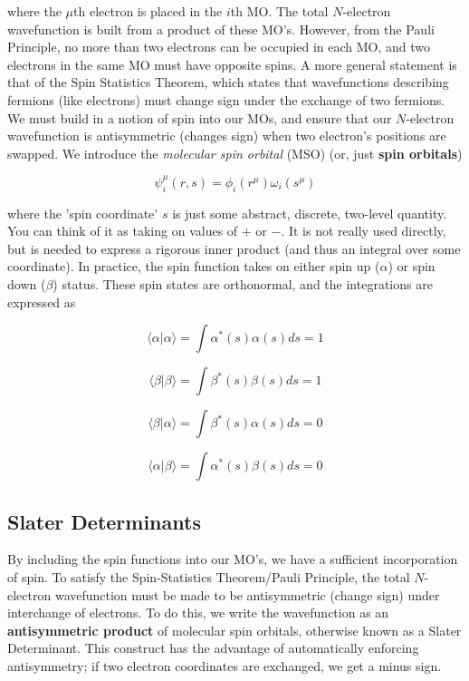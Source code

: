 \documentclass[11pt]{article}
\begin{document}
where the \(\mu\)th electron is placed in the \(i\)th MO. The total
\(N\)-electron wavefunction is built from a product of these MO's.
However, from the Pauli Principle, no more than two electrons can be
occupied in each MO, and two electrons in the same MO must have opposite
spins. A more general statement is that of the Spin Statistics Theorem,
which states that wavefunctions describing fermions (like electrons)
must change sign under the exchange of two fermions. We must build in a
notion of spin into our MOs, and ensure that our \(N\)-electron
wavefunction is antisymmetric (changes sign) when two electron's
positions are swapped. We introduce the \emph{molecular spin orbital}
(MSO) (or, just \textbf{spin orbitals})

\[\psi_i^\mu(r,s) = \phi_i(r^\mu) \omega_i(s^\mu)\]

where the 'spin coordinate' \(s\) is just some abstract, discrete,
two-level quantity. You can think of it as taking on values of \(+\) or
\(-\). It is not really used directly, but is needed to express a
rigorous inner product (and thus an integral over some coordinate). In
practice, the spin function takes on either spin up (\(\alpha\)) or spin
down (\(\beta\)) status. These spin states are orthonormal, and
the integrations are expressed as

\[\langle \alpha | \alpha \rangle =  \int \alpha^*(s) \alpha(s) ds = 1\]

\[\langle \beta | \beta \rangle = \int \beta^*(s) \beta(s) ds = 1 \]

\[\langle \beta | \alpha \rangle = \int \beta^*(s) \alpha(s) ds = 0 \]

\[\langle \alpha | \beta \rangle = \int \alpha^*(s) \beta(s) ds = 0 \]

\subsection{Slater Determinants}

By including the spin functions into our MO's, we have a sufficient
incorporation of spin. To satisfy the Spin-Statistics Theorem/Pauli
Principle, the total \(N\)-electron wavefunction must be made to be
antisymmetric (change sign) under interchange of electrons. To do this,
we write the wavefunction as an \textbf{antisymmetric product} of
molecular spin orbitals, otherwise known as a Slater Determinant. This
construct has the advantage of automatically enforcing antisymmetry; if
two electron coordinates are exchanged, we get a minus sign.
\end{document}
